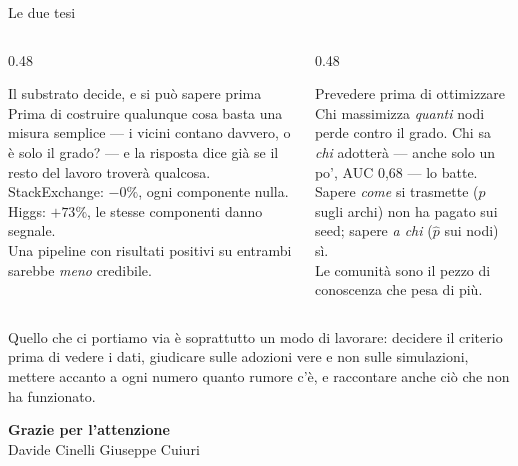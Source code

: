 \documentclass[aspectratio=169,10pt]{beamer}
\newcommand{\male}[1]{{\color{bordeaux}#1}}
\newcommand{\pos}[1]{{\color{petrolioscuro}#1}}
\newcommand{\phat}{\hat{p}}
\begin{document}
\begin{frame}{Le due tesi}
  \begin{columns}[T]
    \begin{column}{0.48\textwidth}
      \begin{block}{Il substrato decide, e si pu\`o sapere prima}
        \small Prima di costruire qualunque cosa basta una misura semplice --- i vicini contano davvero, o \`e solo il grado? --- e la risposta dice gi\`a se il resto del lavoro trover\`a qualcosa.\\[0.4em]
        StackExchange: \male{$-0\%$}, ogni componente nulla.\\
        Higgs: \pos{$+73\%$}, le stesse componenti danno segnale.\\[0.4em]
        Una pipeline con risultati positivi su entrambi sarebbe \emph{meno} credibile.
      \end{block}
    \end{column}
    \begin{column}{0.48\textwidth}
      \begin{block}{Prevedere prima di ottimizzare}
        \small Chi massimizza \emph{quanti} nodi perde contro il grado. Chi sa \emph{chi} adotter\`a --- anche solo un po', AUC 0,68 --- lo batte.\\[0.4em]
        Sapere \emph{come} si trasmette ($p$ sugli archi) non ha pagato sui seed; sapere \emph{a chi} ($\phat$ sui nodi) s\`i.\\[0.4em]
        Le comunit\`a sono il pezzo di conoscenza che pesa di pi\`u.
      \end{block}
    \end{column}
  \end{columns}
  \vspace{0.8em}
  \centering\small\color{grigio}
  Quello che ci portiamo via \`e soprattutto un modo di lavorare: decidere il criterio prima di vedere i dati, giudicare sulle adozioni vere e non sulle simulazioni, mettere accanto a ogni numero quanto rumore c'\`e, e raccontare anche ci\`o che non ha funzionato.
\end{frame}

\begin{frame}[plain]
  \centering
  \vfill
  {\fontsize{30}{36}\selectfont\bfseries\color{petrolioscuro}Grazie per l'attenzione}\\[1.2em]
  {\color{grigio}Davide Cinelli \textperiodcentered{} Giuseppe Cuiuri}
  \vfill
\end{frame}
\end{document}
